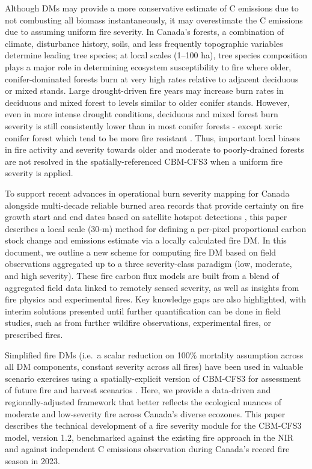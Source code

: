 \documentclass[, manuscript]{copernicus}
\begin{document}
Although DMs may provide a more conservative estimate of C emissions due
to not combusting all biomass instantaneously, it may overestimate the C
emissions due to assuming uniform fire severity. In Canada's forests, a
combination of climate, disturbance history, soils, and less frequently
topographic variables determine leading tree species; at local scales
(1--100 ha), tree species composition plays a major role in determining
ecosystem susceptibility to fire \citep{bernier2016} where older,
conifer-dominated forests burn at very high rates relative to adjacent
deciduous or mixed stands. Large drought-driven fire years may increase
burn rates in deciduous and mixed forest to levels similar to older
conifer stands\citep{parksNewMetricQuantifying2014}. However, even in
more intense drought conditions, deciduous and mixed forest burn
severity is still consistently lower than in most conifer forests -
except xeric conifer forest which tend to be more fire resistant
\citep{whitman2018}. Thus, important local biases in fire activity and
severity towards older and moderate to poorly-drained forests are not
resolved in the spatially-referenced CBM-CFS3 when a uniform fire
severity is applied.

To support recent advances in operational burn severity mapping for
Canada \citep{whitman2020} alongside multi-decade reliable burned area
records that provide certainty on fire growth start and end dates based
on satellite hotspot detections
\citep{guindon2014, guindon2020, hall2020}, this paper describes a local
scale (30-m) method for defining a per-pixel proportional carbon stock
change and emissions estimate via a locally calculated fire DM. In this
document, we outline a new scheme for computing fire DM based on field
observations aggregated up to a three severity-class paradigm (low,
moderate, and high severity). These fire carbon flux models are built
from a blend of aggregated field data linked to remotely sensed
severity, as well as insights from fire physics and experimental fires.
Key knowledge gaps are also highlighted, with interim solutions
presented until further quantification can be done in field studies,
such as from further wildfire observations, experimental fires, or
prescribed fires.

Simplified fire DMs (i.e.~a scalar reduction on 100\% mortality
assumption across all DM components, constant severity across all fires)
have been used in valuable scenario exercises using a spatially-explicit
version of CBM-CFS3 for assessment of future fire and harvest scenarios
\citep{smyth2022}. Here, we provide a data-driven and
regionally-adjusted framework that better reflects the ecological
nuances of moderate and low-severity fire across Canada's diverse
ecozones. This paper describes the technical development of a fire
severity module for the CBM-CFS3 model, version 1.2, benchmarked against
the existing fire approach in the NIR and against independent C
emissions observation during Canada's record fire season in 2023.
\end{document}

